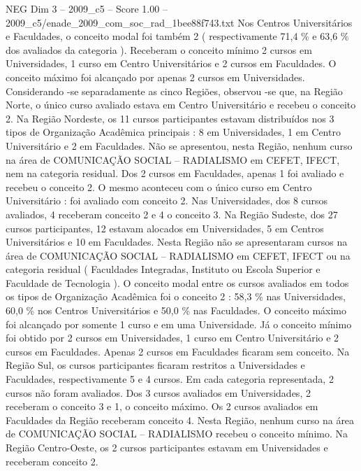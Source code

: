 \begin{textsample}{NEG Dim 3 – 2009\_c5 – Score 1.00 – 2009\_c5/enade\_2009\_com\_soc\_rad\_1bee88f743.txt}
Nos Centros Universitários e Faculdades, o conceito modal foi também 2 ( respectivamente 71,4 \% e 63,6 \% dos avaliados da categoria ).
Receberam o conceito mínimo 2 cursos em Universidades, 1 curso em Centro Universitários e 2 cursos em Faculdades.
O conceito máximo foi alcançado por apenas 2 cursos em Universidades.
Considerando -se separadamente as cinco Regiões, observou -se que, na Região Norte, o único curso avaliado estava em Centro Universitário e recebeu o conceito 2.
Na Região Nordeste, os 11 cursos participantes estavam distribuídos nos 3 tipos de Organização Acadêmica principais : 8 em Universidades, 1 em Centro Universitário e 2 em Faculdades.
Não se apresentou, nesta Região, nenhum curso na área de COMUNICAÇÃO SOCIAL – RADIALISMO em CEFET, IFECT, nem na categoria residual.
Dos 2 cursos em Faculdades, apenas 1 foi avaliado e recebeu o conceito 2.
O mesmo aconteceu com o único curso em Centro Universitário : foi avaliado com conceito 2.
Nas Universidades, dos 8 cursos avaliados, 4 receberam conceito 2 e 4 o conceito 3.
Na Região Sudeste, dos 27 cursos participantes, 12 estavam alocados em Universidades, 5 em Centros Universitários e 10 em Faculdades.
Nesta Região não se apresentaram cursos na área de COMUNICAÇÃO SOCIAL – RADIALISMO em CEFET, IFECT ou na categoria residual ( Faculdades Integradas, Instituto ou Escola Superior e Faculdade de Tecnologia ).
O conceito modal entre os cursos avaliados em todos os tipos de Organização Acadêmica foi o conceito 2 : 58,3 \% nas Universidades, 60,0 \% nos Centros Universitários e 50,0 \% nas Faculdades.
O conceito máximo foi alcançado por somente 1 curso e em uma Universidade.
Já o conceito mínimo foi obtido por 2 cursos em Universidades, 1 curso em Centro Universitário e 2 cursos em Faculdades.
Apenas 2 cursos em Faculdades ficaram sem conceito.
Na Região Sul, os cursos participantes ficaram restritos a Universidades e Faculdades, respectivamente 5 e 4 cursos.
Em cada categoria representada, 2 cursos não foram avaliados.
Dos 3 cursos avaliados em Universidades, 2 receberam o conceito 3 e 1, o conceito máximo.
Os 2 cursos avaliados em Faculdades da Região receberam conceito 4.
Nesta Região, nenhum curso na área de COMUNICAÇÃO SOCIAL – RADIALISMO recebeu o conceito mínimo.
Na Região Centro-Oeste, os 2 cursos participantes estavam em Universidades e receberam conceito 2.

\end{textsample}
